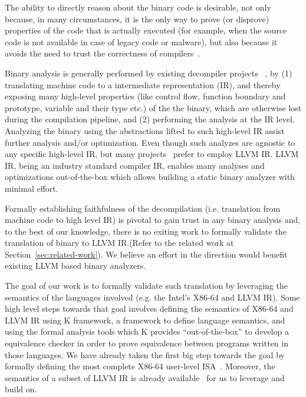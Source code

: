 
The ability to directly reason about the binary code is desirable, not only
because, in many circumstances, it is the only way to prove (or disprove)
  properties of the code that is actually executed (for example, when the
      source code is not available in case of legacy code or malware), but also
  because it avoids the need to trust the correctness of
  compilers~\cite{Thompson,WYSINWYE}.

Binary analysis is generally performed by existing decompiler projects
~\cite{McSema:Recon14,Remill,Angr1,BAP:CAV11,Radare2}, by (1) translating
machine code to a intermediate representation (IR), and thereby exposing many
high-level properties (like control flow, function boundary and prototype,
    variable and their type etc.) of the the binary, which are otherwise lost
during the compilation pipeline, and (2) performing the analysis at the IR
level.  Analyzing the binary using the abstractions lifted to such high-level
IR assist further analysis and/or optimization. Even though such analyzes are
agnostic to any specific high-level IR, but many
projects~\cite{McSema:Recon14,Remill,FCD,reopt,llvm-mctoll} prefer to employ
LLVM IR. LLVM IR, being an industry standard compiler IR, enables many analyses
and optimizations out-of-the-box which allows building a static binary analyzer
with minimal effort.

Formally establishing faithfulness of the decompilation (i.e. translation from
    machine code to high level IR) is pivotal to gain trust in any binary
analysis and, to the best of our knowledge, there is no exiting work to
formally validate the translation of binary to LLVM IR.(Refer to the related
    work at Section~\ref{sec:related-work}).  We believe an effort in the
direction would benefit existing LLVM based binary analyzers.

The goal of our work is to formally validate such translation by leveraging the
semantics of the languages involved (e.g. the Intel's X86-64 and LLVM IR). Some
high level steps towards that goal involves defining the semantics of X86-64
and LLVM IR using K framework, a framework to define language semantics, and
using the formal analysis tools which K provides ``out-of-the-box'' to develop
a equivalence checker in order to prove equivalence between programs written in
those languages.  We have already taken the first big step towards the goal by
formally defining the most complete X86-64 user-level
ISA~\cite{DasguptaAdve:PLDI19}. Moreover, the semantics of a subset of LLVM IR
is already available~\cite{LLVMSEMA} for us to leverage and build on.

